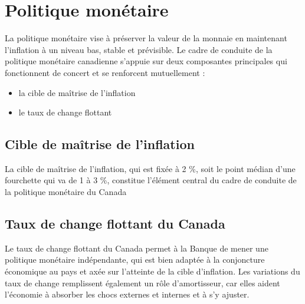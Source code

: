 \documentclass[letterpaper, 12pt]{article}
\newcommand{\1}{\mathds{1}}	%
\theoremstyle{definition}
\begin{document}
\section{Politique monétaire}
La politique monétaire vise à préserver la valeur de la monnaie en maintenant l’inflation à un niveau bas, stable et prévisible.  Le cadre de conduite de la politique monétaire canadienne s’appuie sur deux composantes principales qui fonctionnent de concert et se renforcent mutuellement : 
\begin{itemize}
\item la cible de maîtrise de l’inflation
\item le taux de change flottant
\end{itemize}
\subsection{Cible de maîtrise de l’inflation}
La cible de maîtrise de l’inflation, qui est fixée à 2 \%, soit le point médian d’une fourchette qui va de 1 à 3 \%, constitue l’élément central du cadre de conduite de la politique monétaire du Canada
\subsection{Taux de change flottant du Canada}
Le taux de change flottant du Canada permet à la Banque de mener une politique monétaire indépendante, qui est bien adaptée à la conjoncture économique au pays et axée sur l’atteinte de la cible d’inflation. Les variations du taux de change remplissent également un rôle d’amortisseur,  car elles aident l’économie à absorber les chocs externes et internes et à s’y ajuster.
\end{document}
